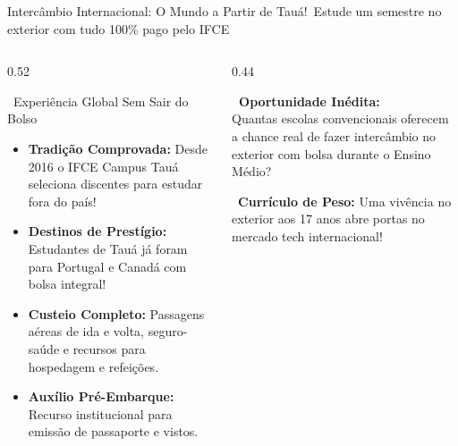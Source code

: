 \begin{frame}{Intercâmbio Internacional: O Mundo a Partir de Tauá!}{\faPlaneDeparture\ Estude um semestre no exterior com tudo 100\% pago pelo IFCE}
  \begin{columns}[t]
    \begin{column}{0.52\textwidth}
      \begin{bluecard}{\faGlobeAmericas\ Experiência Global Sem Sair do Bolso}
        \tiny
        \begin{itemize}\setlength{\itemsep}{0.18em}
          \item \textbf{Tradição Comprovada:} Desde 2016 o IFCE Campus Tauá seleciona discentes para estudar fora do país!
          \item \textbf{Destinos de Prestígio:} Estudantes de Tauá já foram para Portugal e Canadá com bolsa integral!
          \item \textbf{Custeio Completo:} Passagens aéreas de ida e volta, seguro-saúde e recursos para hospedagem e refeições.
          \item \textbf{Auxílio Pré-Embarque:} Recurso institucional para emissão de passaporte e vistos.
        \end{itemize}
      \end{bluecard}
    \end{column}
    
    \begin{column}{0.44\textwidth}
      \begin{tcolorbox}[
        enhanced,
        colback=IFCELightRed,
        colframe=IFCERed,
        arc=2mm,
        boxrule=0.7pt,
        left=2mm, right=2mm, top=1.8mm, bottom=1.8mm
      ]
        \tiny
        \textbf{\textcolor{IFCERed}{\faPassport\ Oportunidade Inédita:}} \\
        \vspace{0.06cm}
        Quantas escolas convencionais oferecem a chance real de fazer intercâmbio no exterior com bolsa durante o Ensino Médio?
      \end{tcolorbox}
      \vspace{0.08cm}
      \begin{statcard}
        \tiny \textcolor{TechDark}{\faStar\ \textbf{Currículo de Peso:} Uma vivência no exterior aos 17 anos abre portas no mercado tech internacional!}
      \end{statcard}
    \end{column}
  \end{columns}
\end{frame}

